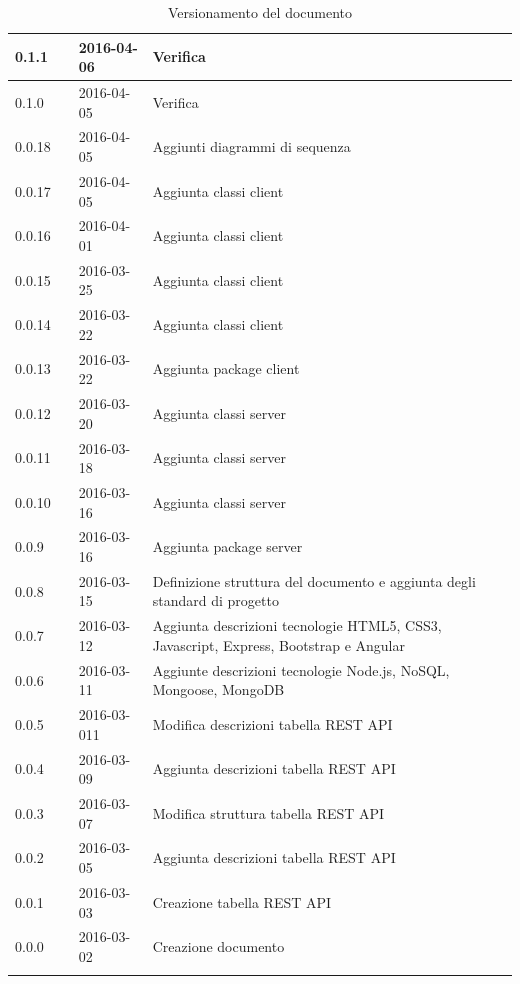 \documentclass[12pt,a4paper]{article}
\begin{document}
\begin{center}
\begin{longtable}[H]{p{} p{} p{} p{}}
		\midrule
		0.1.1 & \AB{} & 2016-04-06 & Verifica \\*
		\midrule
		0.1.0 & \IB{} & 2016-04-05 & Verifica \\*
		\midrule
		0.0.18 & \NDC{} & 2016-04-05 & Aggiunti diagrammi di sequenza \\*
		\midrule
		0.0.17 & \IB{} & 2016-04-05 & Aggiunta classi client \\*
		\midrule
		0.0.16 & \WS{} & 2016-04-01 & Aggiunta classi client \\*
		\midrule
		0.0.15 & \AB{} & 2016-03-25 & Aggiunta classi client \\*
		\midrule
		0.0.14 & \NDC{} & 2016-03-22 & Aggiunta classi client \\*
		\midrule
		0.0.13 & \NDC{} & 2016-03-22 & Aggiunta package client \\*
		\midrule
		0.0.12 & \AVE{} & 2016-03-20 & Aggiunta classi server \\*
		\midrule
		0.0.11 & \AVI{} & 2016-03-18 & Aggiunta classi server \\*
		\midrule
		0.0.10 & \TP{} & 2016-03-16 & Aggiunta classi server \\*
		\midrule
		0.0.9 & \TP{} & 2016-03-16 & Aggiunta package server \\*
        \midrule
        0.0.8 & \NDC{} & 2016-03-15 & Definizione struttura del documento e aggiunta
            degli standard di progetto \\*
		\midrule
		0.0.7 & \AVE{} & 2016-03-12 & Aggiunta descrizioni tecnologie HTML5, CSS3, Javascript, 
            Express, Bootstrap e Angular \\*
		\midrule
		0.0.6 & \AVE{} & 2016-03-11 & Aggiunte descrizioni tecnologie Node.js, NoSQL, Mongoose, MongoDB \\*
		\midrule
		0.0.5 & \AVE{} & 2016-03-011 & Modifica descrizioni tabella REST API \\*
		\midrule
		0.0.4 & \TP{} & 2016-03-09 &  Aggiunta descrizioni tabella REST API \\*
		\midrule
		0.0.3 & \TP{} & 2016-03-07 &  Modifica struttura tabella REST API \\*
		\midrule
		0.0.2 & \AVI{} & 2016-03-05 &  Aggiunta descrizioni tabella REST API \\*
		\midrule
		0.0.1 & \NDC{} & 2016-03-03 &  Creazione tabella REST API \\*
		\midrule
		0.0.0 & \NDC{} & 2016-03-02 &  Creazione documento \\*
		\bottomrule
		\caption{Versionamento del documento}
		\label{tabVers1} 
	\end{longtable}
\end{center}
\end{document}
